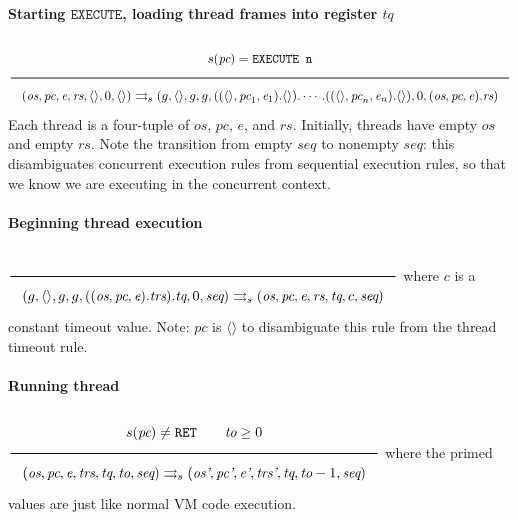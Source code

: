 \documentclass[11pt]{article}
\newcommand{\Rule}[2]{\genfrac{}{}{0.7pt}{}{{\setlength{\fboxrule}{0pt}\setlength{\fboxsep}{3mm}\fbox{$#1$}}}{{\setlength{\fboxrule}{0pt}\setlength{\fboxsep}{3mm}\fbox{$#2$}}}}
\newcommand{\transition}{\rightrightarrows_s}
\begin{document}
\paragraph{Starting \(\texttt{EXECUTE}\), loading thread frames into register \(\textit{tq}\)}
\label{sec:orgdf43f47}
\(\\\Rule{s(\textit{pc}) = \texttt{EXECUTE n}}{(\textit{os}, \textit{pc}, \textit{e}, \textit{rs}, \langle \rangle, 0, \langle \rangle) \transition (g, \langle \rangle, g, g, ((\langle \rangle, \textit{pc}_1, \textit{e}_1).\langle \rangle). \cdots .((\langle \rangle, \textit{pc}_n, \textit{e}_n).\langle \rangle), 0, (\textit{os}, \textit{pc}, \textit{e}).\textit{rs})}\\\)
Each thread is a four-tuple of \(\textit{os}\), \(\textit{pc}\), \(\textit{e}\), and \(\textit{rs}\). Initially, threads have empty \(\textit{os}\) and empty \(\textit{rs}\). Note the transition from empty \(\textit{seq}\) to nonempty \(\textit{seq}\): this disambiguates concurrent execution rules from sequential execution rules, so that we know we are executing in the concurrent context.

\paragraph{Beginning thread execution}
\label{sec:orgc7b21eb}
\(\\\Rule{}{(g, \langle \rangle, g, g, ((\textit{os}, \textit{pc}, \textit{e}).\textit{trs}).\textit{tq}, 0, \textit{seq}) \transition (\textit{os}, \textit{pc}, \textit{e}, \textit{rs}, \textit{tq}, c, \textit{seq})}\\\)
where \(c\) is a constant timeout value. Note: \(\textit{pc}\) is \(\langle \rangle\) to disambiguate this rule from the thread timeout rule.

\paragraph{Running thread}
\label{sec:org755c72f}
\(\\\Rule{s(\textit{pc}) \neq \texttt{RET} \qquad \textit{to} \ge 0}{(\textit{os}, \textit{pc}, \textit{e}, \textit{trs}, \textit{tq}, \textit{to}, \textit{seq}) \transition (\textit{os'}, \textit{pc'}, \textit{e'}, \textit{trs'}, \textit{tq}, \textit{to}-1, \textit{seq})}\\\)
where the primed values are just like normal VM code execution.
\end{document}
